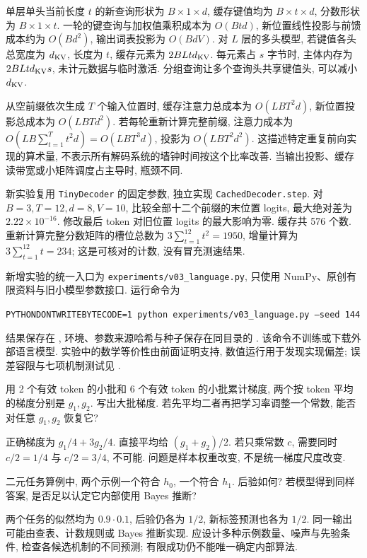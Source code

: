 单层单头当前长度 $t$ 的新查询形状为 $B\times1\times d$, 缓存键值均为 $B\times t\times d$, 分数形状为 $B\times1\times t$. 一轮的键查询与加权值乘积成本为 $O(Btd)$, 新位置线性投影与前馈成本约为 $O(Bd^2)$, 输出词表投影为 $O(BdV)$. 对 $L$ 层的多头模型, 若键值各头总宽度为 $d_{\rm KV}$, 长度为 $t$, 缓存元素为 $2BLtd_{\rm KV}$. 每元素占 $s$ 字节时, 主体内存为 $2BLtd_{\rm KV}s$, 未计元数据与临时激活. 分组查询让多个查询头共享键值头, 可以减小 $d_{\rm KV}$.

从空前缀依次生成 $T$ 个输入位置时, 缓存注意力总成本为 $O(LBT^2d)$, 新位置投影总成本为 $O(LBTd^2)$. 若每轮重新计算完整前缀, 注意力成本为 $O(LB\sum_{t=1}^Tt^2d)=O(LBT^3d)$, 投影为 $O(LBT^2d^2)$. 这描述特定重复前向实现的算术量, 不表示所有解码系统的墙钟时间按这个比率改善. 当输出投影、缓存读带宽或小矩阵调度占主导时, 瓶颈不同.

新实验复用 \texttt{TinyDecoder} 的固定参数, 独立实现 \texttt{CachedDecoder.step}. 对 $B=3,T=12,d=8,V=10$, 比较全部十二个前缀的末位置 logits, 最大绝对差为 $2.22\times10^{-16}$. 修改最后 token 对旧位置 logits 的最大影响为零. 缓存共 576 个数. 重新计算完整分数矩阵的槽位总数为 $3\sum_{t=1}^{12}t^2=1950$, 增量计算为 $3\sum_{t=1}^{12}t=234$; 这是可核对的计数, 没有冒充测速结果.

新增实验的统一入口为 \texttt{experiments/v03\_language.py}, 只使用 NumPy、原创有限资料与旧小模型参数接口. 运行命令为
\begin{center}\texttt{PYTHONDONTWRITEBYTECODE=1 python experiments/v03\_language.py --seed 144}\end{center}
结果保存在 , 环境、参数来源哈希与种子保存在同目录的 . 该命令不训练或下载外部语言模型. 实验中的数学等价性由前面证明支持, 数值运行用于发现实现偏差; 误差容限与七项机制测试见 .

\begin{exercise}
用 2 个有效 token 的小批和 6 个有效 token 的小批累计梯度, 两个按 token 平均的梯度分别是 $g_1,g_2$. 写出大批梯度. 若先平均二者再把学习率调整一个常数, 能否对任意 $g_1,g_2$ 恢复它?
\end{exercise}
\begin{solution}
正确梯度为 $g_1/4+3g_2/4$. 直接平均给 $(g_1+g_2)/2$. 若只乘常数 $c$, 需要同时 $c/2=1/4$ 与 $c/2=3/4$, 不可能. 问题是样本权重改变, 不是统一梯度尺度改变.
\end{solution}
\begin{exercise}
二元任务算例中, 两个示例一个符合 $h_0$, 一个符合 $h_1$. 后验如何? 若模型得到同样答案, 是否足以认定它内部使用 Bayes 推断?
\end{exercise}
\begin{solution}
两个任务的似然均为 $0.9\cdot0.1$, 后验仍各为 $1/2$, 新标签预测也各为 $1/2$. 同一输出可能由查表、计数规则或 Bayes 推断实现. 应设计多种示例数量、噪声与先验条件, 检查各候选机制的不同预测; 有限成功仍不能唯一确定内部算法.
\end{solution}
\label{ch:end:prediction}
